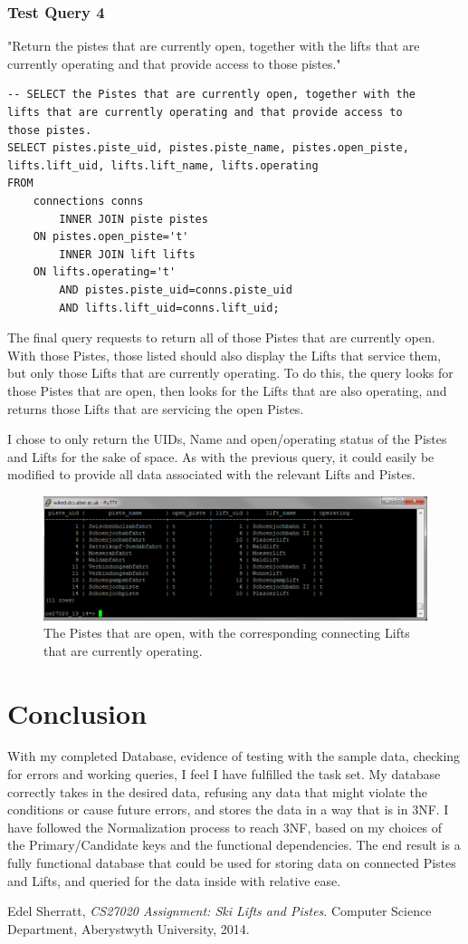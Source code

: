 \documentclass[11pt]{scrartcl} %
\begin{document}
\newpage

\subsubsection{Test Query 4}
"Return the pistes that are currently open, together with the lifts that are currently operating and that provide access to those pistes."
\begin{lstlisting}
-- SELECT the Pistes that are currently open, together with the 
lifts that are currently operating and that provide access to 
those pistes.
SELECT pistes.piste_uid, pistes.piste_name, pistes.open_piste, 
lifts.lift_uid, lifts.lift_name, lifts.operating
FROM
	connections conns
		INNER JOIN piste pistes
	ON pistes.open_piste='t' 
		INNER JOIN lift lifts
	ON lifts.operating='t'
		AND pistes.piste_uid=conns.piste_uid
		AND lifts.lift_uid=conns.lift_uid;
\end{lstlisting}

The final query requests to return all of those Pistes that are currently open. With those Pistes, those listed should also display the Lifts that service them, but only those Lifts that are currently operating. To do this, the query looks for those Pistes that are open, then looks for the Lifts that are also operating, and returns those Lifts that are servicing the open Pistes.

I chose to only return the UIDs, Name and open/operating status of the Pistes and Lifts for the sake of space. As with the previous query, it could easily be modified to provide all data associated with the relevant Lifts and Pistes.

\begin{figure}[H]
  \centering
    \includegraphics[width=1\textwidth]{IMG/query_4_1.png}
 \caption{The Pistes that are open, with the corresponding connecting Lifts that are currently operating.}
\end{figure}

\section{Conclusion}
With my completed Database, evidence of testing with the sample data, checking for errors and working queries, I feel I have fulfilled the task set. My database correctly takes in the desired data, refusing any data that might violate the conditions or cause future errors, and stores the data in a way that is in 3NF. I have followed the Normalization process to reach 3NF, based on my choices of the Primary/Candidate keys and the functional dependencies. The end result is a fully functional database that could be used for storing data on connected Pistes and Lifts, and queried for the data inside with relative ease.

\newpage
\begin{thebibliography}{9}

  Edel Sherratt,
  \emph{CS27020 Assignment: Ski Lifts and Pistes}.
  Computer Science Department,
  Aberystwyth University,
  2014.

\end{thebibliography}
\end{document}
